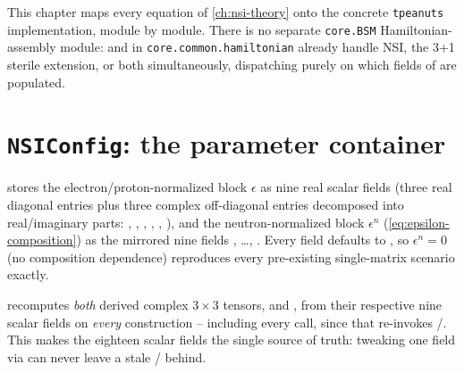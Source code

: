 \label{ch:nsi-implementation}

This chapter maps every equation of \cref{ch:nsi-theory} onto the concrete
\texttt{tpeanuts} implementation, module by module. There is no separate
\texttt{core.BSM} Hamiltonian-assembly module: 
and  in \texttt{core.common.hamiltonian}
already handle NSI, the 3+1 sterile extension, or both simultaneously,
dispatching purely on which fields of  are
populated.

\section{\texttt{NSIConfig}: the parameter container}
\label{sec:impl-nsiconfig}


\begin{implbox}
 stores the electron/proton-normalized block $\epsilon$
as nine real scalar fields (three real diagonal entries plus three complex
off-diagonal entries decomposed into real/imaginary parts:
, , , ,
, ), and the
neutron-normalized block $\epsilon^n$ (\cref{eq:epsilon-composition}) as the
mirrored nine fields , \dots, .
Every field defaults to , so $\epsilon^n=0$ (no composition
dependence) reproduces every pre-existing single-matrix scenario exactly.

 recomputes \emph{both} derived complex $3\times3$
tensors,  and , from their respective nine
scalar fields on \emph{every} construction -- including every
 call, since that re-invokes
/. This makes the eighteen
scalar fields the single source of truth: tweaking one field via
 can never leave a stale /
behind.
\end{implbox}

